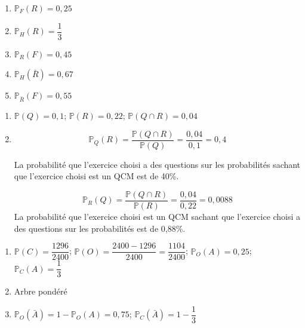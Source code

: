 \documentclass[french]{book}
\begin{document}
\begin{corrige}
\begin{enumerate}
\item $\mathbb{P}_F(R)=0,25$
\item $\mathbb{P}_H(R)=\dfrac{1}{3}$
\item $\mathbb{P}_R(F)=0,45$
\item $\mathbb{P}_H(\bar{R})=0,67$
\item $\mathbb{P}_{\bar{R}}(F)=0,55$
\end{enumerate}
\end{corrige}

\begin{corrige}
\begin{enumerate}
\item $\mathbb{P}(Q)=0,1$; $\mathbb{P}(R)=0,22$; $\mathbb{P}(Q \cap R)=0,04$
\item $$\mathbb{P}_Q(R)=\dfrac{\mathbb{P}(Q\cap R)}{\mathbb{P}(Q)}=\dfrac{0,04}{0,1}=0,4$$

La probabilité que l'exercice choisi a des questions sur les probabilités sachant que l'exercice choisi est un QCM est de 40\%.

 $$\mathbb{P}_R(Q)=\dfrac{\mathbb{P}(Q\cap R)}{\mathbb{P}(R)}=\dfrac{0,04}{0,22}=0,0088$$
La probabilité que l'exercice choisi est un QCM sachant que l'exercice choisi a des questions sur les probabilités est de 0,88\%.
\end{enumerate}
\end{corrige}

\begin{corrige}
\begin{enumerate}
\item $\mathbb{P}(C)=\dfrac{1296}{2400}$; $\mathbb{P}(O)=\dfrac{2400-1296}{2400}=\dfrac{1104}{2400}$; $\mathbb{P}_O(A)=0,25$; $\mathbb{P}_C(A)=\dfrac{1}{3}$
\item Arbre pondéré
\begin{center}
\end{center}

\item $\mathbb{P}_O(\bar{A})=1-\mathbb{P}_O(A)=0,75$; $\mathbb{P}_C(\bar{A})=1-\dfrac{1}{3}$

\end{enumerate}
\end{corrige}
\end{document}
